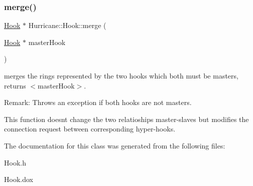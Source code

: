 \subsubsection{\texorpdfstring{merge()}{merge()}}
{\footnotesize\ttfamily \mbox{\hyperlink{classHurricane_1_1Hook}{Hook}} $\ast$ Hurricane\+::\+Hook\+::merge (\begin{DoxyParamCaption}\item[{\mbox{\hyperlink{classHurricane_1_1Hook}{Hook}} $\ast$}]{master\+Hook }\end{DoxyParamCaption})}

merges the rings represented by the two hooks which both must be masters, returns {\ttfamily $<$master\+Hook$>$}.

\begin{DoxyParagraph}{Remark\+: Throws an exception if both hooks are not masters. }

\end{DoxyParagraph}
This function doesn\textquotesingle{}t change the two relatioships master-\/slaves but modifies the connection request between corresponding hyper-\/hooks. 

The documentation for this class was generated from the following files\+:\begin{DoxyCompactItemize}
\item 
Hook.\+h\item 
Hook.\+dox\end{DoxyCompactItemize}
